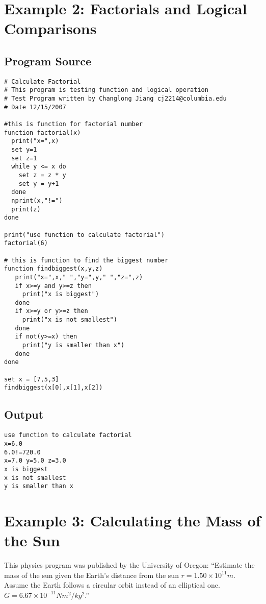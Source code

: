 \section{Example 2: Factorials and Logical Comparisons}

\subsection{Program Source}

\begin{verbatim}
# Calculate Factorial
# This program is testing function and logical operation
# Test Program written by Changlong Jiang cj2214@columbia.edu
# Date 12/15/2007 

#this is function for factorial number
function factorial(x)
  print("x=",x)
  set y=1
  set z=1
  while y <= x do
    set z = z * y
    set y = y+1
  done
  nprint(x,"!=")
  print(z)
done 

print("use function to calculate factorial")
factorial(6) 

# this is function to find the biggest number
function findbiggest(x,y,z)
   print("x=",x," ","y=",y," ","z=",z)
   if x>=y and y>=z then
     print("x is biggest")
   done
   if x>=y or y>=z then
     print("x is not smallest")
   done
   if not(y>=x) then
     print("y is smaller than x")
   done
done 

set x = [7,5,3]
findbiggest(x[0],x[1],x[2])
\end{verbatim}

\subsection{Output}

\begin{verbatim}
use function to calculate factorial
x=6.0
6.0!=720.0
x=7.0 y=5.0 z=3.0
x is biggest
x is not smallest
y is smaller than x 
\end{verbatim}





\section{Example 3: Calculating the Mass of the Sun}

This physics program was published by the University of
Oregon\cite{sunmass}: ``Estimate the mass of the sun given the Earth's
distance from the sun \(r = 1.50 \times 10^{11}m\).  Assume the Earth
follows a circular orbit instead of an elliptical one.  \(G = 6.67
\times 10^{-11} Nm^{2}/kg^{2}\).''

